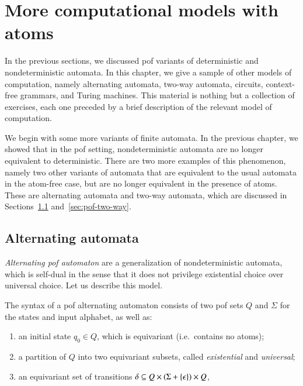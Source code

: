 \chapter{More computational models with atoms}
\label{cha:more-models}
In the previous sections, we discussed pof variants of deterministic and nondeterministic automata. In this chapter, we give a sample of  other models of computation, namely alternating automata, two-way automata, circuits, context-free grammars, and Turing machines. 
This material  is nothing but a collection of exercises, each one preceded by a brief description of the relevant model of computation.




We begin with some more variants of finite automata.
In the previous  chapter, we showed that in the pof setting, nondeterministic automata are no longer equivalent to deterministic. There are two more examples of this phenomenon, namely two other variants of automata that are equivalent to the usual automata in the atom-free case, but are no longer equivalent in the presence of atoms. These are alternating automata and two-way automata, which are discussed in Sections~\ref{sec:pof-alternating} and~\ref{sec:pof-two-way}.



\section{Alternating automata}
\label{sec:pof-alternating}

\emph{Alternating pof automaton} are a generalization of  nondeterministic automata, which is self-dual in the sense that it does not privilege existential choice over universal choice. Let us describe this model.

\begin{definition}
	\label{def:pof-alternating-automaton}
	The syntax of a pof alternating automaton consists of two pof sets $Q$ and $\Sigma$ for the states and input alphabet, as well as:
\begin{enumerate}
	\item an initial state $q_0 \in Q$, which is equivariant (i.e.~contains no atoms);
	\item a partition of  $Q$ into two equivariant subsets, called \emph{existential} and \emph{universal};
	\item an equivariant set of transitions $\delta \subseteq Q \times (\Sigma + \{\epsilon\}) \times Q$,
\end{enumerate}
\end{definition}


